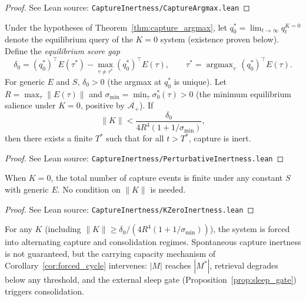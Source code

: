 \begin{proof}
\leanok
{}
See Lean source: \texttt{CaptureInertness/CaptureArgmax.lean}
\end{proof}

\begin{proposition}
\label{prop:capture_inertness}
\leanok
{}
Under the hypotheses of Theorem~\ref{thm:capture_argmax}, let $q_0^* = \lim_{t \to \infty} q_t^{K=0}$ denote the equilibrium query of the $K = 0$ system (existence proven below).  Define the \emph{equilibrium score gap}
\[
\delta_0 = (q_0^*)^\top E(\tau^*) - \max_{\tau \neq \tau^*} (q_0^*)^\top E(\tau), \qquad \tau^* = \operatorname{argmax}_\tau\, (q_0^*)^\top E(\tau).
\]
For generic $E$ and $S$, $\delta_0 > 0$ (the argmax at $q_0^*$ is unique).  Let $R = \max_\tau \|E(\tau)\|$ and $\sigma_{\min} = \min_\tau \sigma_0^*(\tau) > 0$ (the minimum equilibrium salience under $K = 0$, positive by $\mathcal{A}_+$).  If
\[
\|K\| < \frac{\delta_0}{4R^4(1 + 1/\sigma_{\min})},
\]
then there exists a finite $T^*$ such that for all $t > T^*$, capture is inert.
\end{proposition}

\begin{proof}
\leanok
{}
See Lean source: \texttt{CaptureInertness/PerturbativeInertness.lean}
\end{proof}

\begin{corollary}[$K = 0$ capture inertness; $\mathcal{A}_+$]
\label{cor:K_zero_inertness}
\leanok
{}
When $K = 0$, the total number of capture events is finite under any constant $S$ with generic $E$.  No condition on $\|K\|$ is needed.
\end{corollary}

\begin{proof}
\leanok
{}
See Lean source: \texttt{CaptureInertness/KZeroInertness.lean}
\end{proof}

\begin{corollary}
\label{cor:forced_cycle_general_K}
\leanok
{}
For any $K$ (including $\|K\| \geq \delta_0/(4R^4(1 + 1/\sigma_{\min}))$), the system is forced into alternating capture and consolidation regimes.  Spontaneous capture inertness is not guaranteed, but the carrying capacity mechanism of Corollary~\ref{cor:forced_cycle} intervenes: $|M|$ reaches $|M^*|$, retrieval degrades below any threshold, and the external sleep gate (Proposition~\ref{prop:sleep_gate}) triggers consolidation.
\end{corollary}

